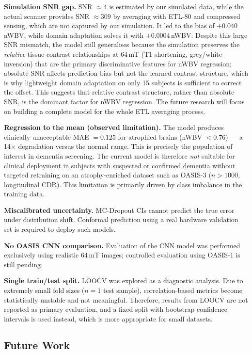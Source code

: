 \documentclass[12pt,a4paper]{article}
\begin{document}
\textbf{Simulation SNR gap.} SNR $\approx 4$ is estimated by our simulated
data, while the actual scanner provides SNR $\approx 309$ by averaging with
ETL-80 and compressed sensing, which are not captured by our simulation. It
led to the bias of $+0.040$\,nWBV, while domain adaptation solves it with
$+0.0004$\,nWBV. Despite this large SNR mismatch, the model still generalises
because the simulation preserves the \emph{relative} tissue contrast
relationships at 64\,mT (T1 shortening, grey/white inversion) that are the
primary discriminative features for nWBV regression; absolute SNR affects
prediction bias but not the learned contrast structure, which is why
lightweight domain adaptation on only 15 subjects is sufficient to correct
the offset. This suggests that relative contrast structure, rather than
absolute SNR, is the dominant factor for nWBV regression. The future research will focus on building a complete model
for the whole ETL averaging process.

\textbf{Regression to the mean (observed limitation).}
The model produces clinically unacceptable MAE $= 0.125$ for atrophied
brains (nWBV $< 0.76$) --- a 14$\times$ degradation versus the normal range.
This is precisely the population of interest in dementia screening.
The current model is therefore \emph{not} suitable for clinical deployment
in subjects with suspected or confirmed dementia without targeted retraining
on an atrophy-enriched dataset such as OASIS-3 ($n > 1000$, longitudinal CDR).
This limitation is primarily driven by class imbalance in the training data.

\textbf{Miscalibrated uncertainty.} MC-Dropout CIs cannot predict the true
error under distribution shift. Conformal prediction using a real hardware
validation set is required to deploy such models.

\textbf{No OASIS CNN comparison.} Evaluation of the CNN model was performed
exclusively using realistic 64\,mT images; controlled evaluation using
OASIS-1 is still pending.

\textbf{Single train/test split.} LOOCV was explored as a diagnostic
analysis. Due to extremely small fold sizes ($n=1$ test sample), correlation-based
metrics become statistically unstable and not meaningful. Therefore, results
from LOOCV are not reported as primary evaluation, and a fixed split with
bootstrap confidence intervals is used instead, which is more appropriate
for small datasets.

\subsection{Future Work}
\end{document}
